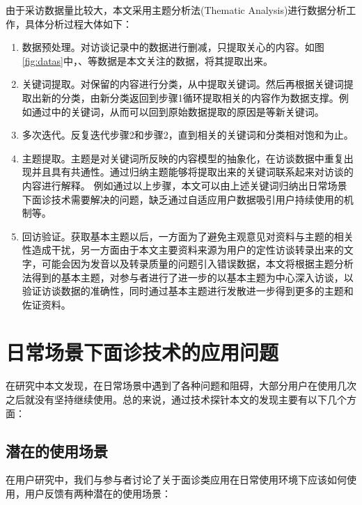 由于采访数据量比较大，本文采用主题分析法(Thematic Analysis)进行数据分析工作，具体分析过程大体如下：
\begin{enumerate}
    \item 数据预处理。对访谈记录中的数据进行删减，只提取关心的内容。如图\ref{fig:datas}中，、等数据是本文关注的数据，将其提取出来。

    \item 关键词提取。对保留的内容进行分类，从中提取关键词。然后再根据关键词提取出新的分类，由新分类返回到步骤1循环提取相关的内容作为数据支撑。例如通过中的关键词，从而可以回到原始数据提取的原因是等新关键词。
    
    \item 多次迭代。反复迭代步骤2和步骤2，直到相关的关键词和分类相对饱和为止。

    \item 主题提取。主题是对关键词所反映的内容模型的抽象化，在访谈数据中重复出现并且具有共通性。通过归纳主题能够将提取出来的关键词联系起来对访谈的内容进行解释。
    例如通过以上步骤，本文可以由上述关键词归纳出日常场景下面诊技术需要解决的问题，缺乏通过自适应用户数据吸引用户持续使用的机制等。

    \item 回访验证。获取基本主题以后，一方面为了避免主观意见对资料与主题的相关性造成干扰，另一方面由于本文主要资料来源为用户的定性访谈转录出来的文字，可能会因为发音以及转录质量的问题引入错误数据，本文将根据主题分析法得到的基本主题，对参与者进行了进一步的以基本主题为中心深入访谈，以验证访谈数据的准确性，同时通过基本主题进行发散进一步得到更多的主题和佐证资料。
\end{enumerate}


\section{日常场景下面诊技术的应用问题}

在研究中本文发现，在日常场景中遇到了各种问题和阻碍，大部分用户在使用几次之后就没有坚持继续使用。总的来说，通过技术探针本文的发现主要有以下几个方面：

\subsection{潜在的使用场景}
在用户研究中，我们与参与者讨论了关于面诊类应用在日常使用环境下应该如何使用，用户反馈有两种潜在的使用场景：

